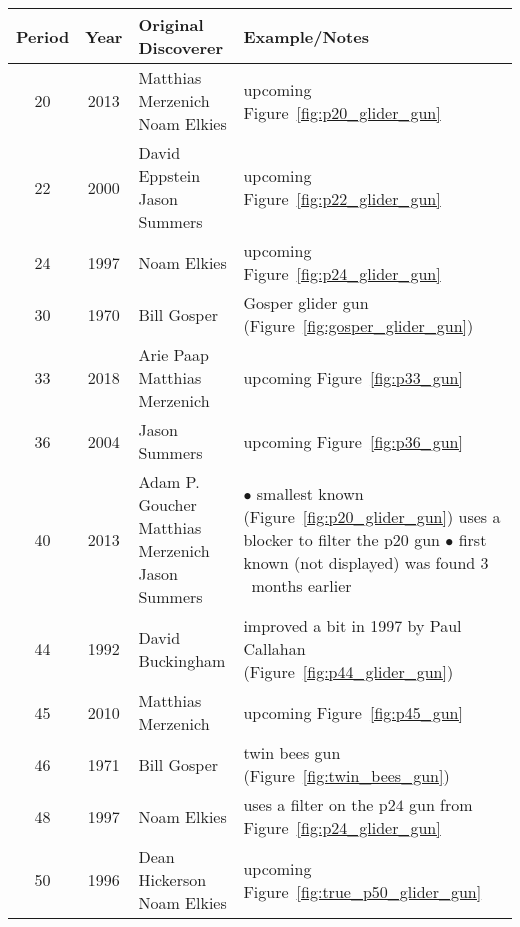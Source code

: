 \begin{table}[htbp]\vspace*{0.05in}
	\begin{center}		
		\begin{tabular}{ccll}
			\toprule
			Period & Year & Original Discoverer & Example/Notes \\ \midrule
			20 & 2013 & \specialcelll[t]{Matthias Merzenich \\ Noam Elkies} & upcoming Figure~\ref{fig:p20_glider_gun} \\
			\rowcolor{gray!20} 22 & 2000 & \specialcelll[t]{David Eppstein \\ Jason Summers} & upcoming Figure~\ref{fig:p22_glider_gun} \\
			24 & 1997 & Noam Elkies & upcoming Figure~\ref{fig:p24_glider_gun} \\
			\rowcolor{gray!20} 30 & 1970 & Bill Gosper & Gosper glider gun (Figure~\ref{fig:gosper_glider_gun}) \\
			33 & 2018 & \specialcelll[t]{Arie Paap \\ Matthias Merzenich} & upcoming Figure~\ref{fig:p33_gun} \\
			\rowcolor{gray!20} 36 & 2004 & Jason Summers & upcoming Figure~\ref{fig:p36_gun} \\
			40 & 2013 & \specialcelll[t]{Adam P. Goucher \\ Matthias Merzenich \\ Jason Summers} & \specialcelll[t]{{\small$\bullet$} smallest known (Figure~\ref{fig:p20_glider_gun}) uses a blocker to \\ \hphantom{\small$\bullet$} filter the p$20$ gun \\ {\small$\bullet$} first known (not displayed) was found $3$~months earlier} \\
			\rowcolor{gray!20} 44 & 1992 & David Buckingham & improved a bit in 1997 by Paul Callahan (Figure~\ref{fig:p44_glider_gun}) \\
			45 & 2010 & Matthias Merzenich & upcoming Figure~\ref{fig:p45_gun} \\
			\rowcolor{gray!20} 46 & 1971 &	Bill Gosper & twin bees gun (Figure~\ref{fig:twin_bees_gun}) \\
			48 & 1997 & Noam Elkies & uses a filter on the p$24$ gun from Figure~\ref{fig:p24_glider_gun} \\
			\rowcolor{gray!20} 50 & 1996 & \specialcelll[t]{Dean Hickerson \\ Noam Elkies} & upcoming Figure~\ref{fig:true_p50_glider_gun} \\

\end{tabular}
\end{center}
\end{table}
